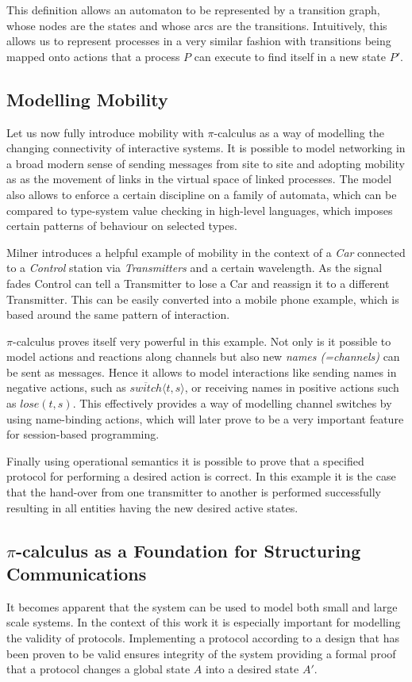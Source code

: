 This definition allows an automaton to be represented by a transition graph, whose nodes are the states and whose arcs are the transitions. Intuitively, this allows us to represent processes in a very similar fashion with transitions being mapped onto actions that a process $P$ can execute to find itself in a new state $P'$.


\subsection{Modelling Mobility}
Let us now fully introduce mobility with $\pi$-calculus as a way of modelling the changing connectivity of interactive systems. It is possible to model networking in a broad modern sense of sending messages from site to site and adopting mobility as as the movement of links in the virtual space of linked processes. The model also allows to enforce a certain discipline on a family of automata, which can be compared to type-system value checking in high-level languages, which imposes certain patterns of behaviour on selected types.

Milner\cite{pi-calculus} introduces a helpful example of mobility in the context of a \textit{Car} connected to a \textit{Control} station via \textit{Transmitters} and a certain wavelength. As the signal fades Control can tell a Transmitter to lose a Car and reassign it to a different Transmitter. This can be easily converted into a mobile phone example, which is based around the same pattern of interaction.

$\pi$-calculus proves itself very powerful in this example. Not only is it possible to model actions and reactions along channels but also new \textit{names (=channels)} can be sent as messages. Hence it allows to model interactions like sending names in negative actions, such as $\overline{switch}\langle t,s \rangle$, or receiving names in positive actions such as $lose(t,s)$. This effectively provides a way of modelling channel switches by using name-binding actions, which will later prove to be a very important feature for session-based programming.

Finally using operational semantics it is possible to prove that a specified protocol for performing a desired action is correct. In this example it is the case that the hand-over from one transmitter to another is performed successfully resulting in all entities having the new desired active states.

\subsection{$\pi$-calculus as a Foundation for Structuring Communications }
It becomes apparent that the system can be used to model both small and large scale systems. In the context of this work it is especially important for modelling the validity of protocols. Implementing a protocol according to a design that has been proven to be valid ensures integrity of the system providing a formal proof that a protocol changes a global state $A$ into a desired state $A'$.

